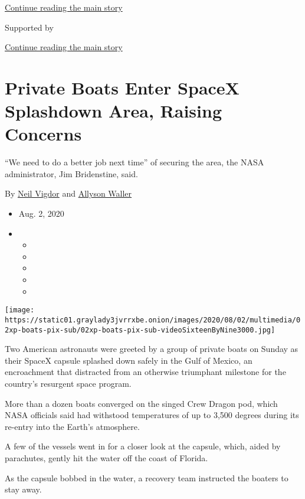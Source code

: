 \protect\hyperlink{after-top}{Continue reading the main story}

Supported by

\protect\hyperlink{after-sponsor}{Continue reading the main story}

\hypertarget{private-boats-enter-spacex-splashdown-area-raising-concerns}{%
\section{Private Boats Enter SpaceX Splashdown Area, Raising
Concerns}\label{private-boats-enter-spacex-splashdown-area-raising-concerns}}

``We need to do a better job next time'' of securing the area, the NASA
administrator, Jim Bridenstine, said.

By \href{https://www.nytimes3xbfgragh.onion/by/neil-vigdor}{Neil Vigdor}
and \href{https://www.nytimes3xbfgragh.onion/by/allyson-waller}{Allyson
Waller}

\begin{itemize}
\item
  Aug. 2, 2020
\item
  \begin{itemize}
  \item
  \item
  \item
  \item
  \item
  \end{itemize}
\end{itemize}

\texttt{[image: https://static01.graylady3jvrrxbe.onion/images/2020/08/02/multimedia/02xp-boats-pix-sub/02xp-boats-pix-sub-videoSixteenByNine3000.jpg]}

Two American astronauts were greeted by a group of private boats on
Sunday as their SpaceX capsule splashed down safely in the Gulf of
Mexico, an encroachment that distracted from an otherwise triumphant
milestone for the country's resurgent space program.

More than a dozen boats converged on the singed Crew Dragon pod, which
NASA officials said had withstood temperatures of up to 3,500 degrees
during its re-entry into the Earth's atmosphere.

A few of the vessels went in for a closer look at the capsule, which,
aided by parachutes, gently hit the water off the coast of Florida.

As the capsule bobbed in the water, a recovery team instructed the
boaters to stay away.

